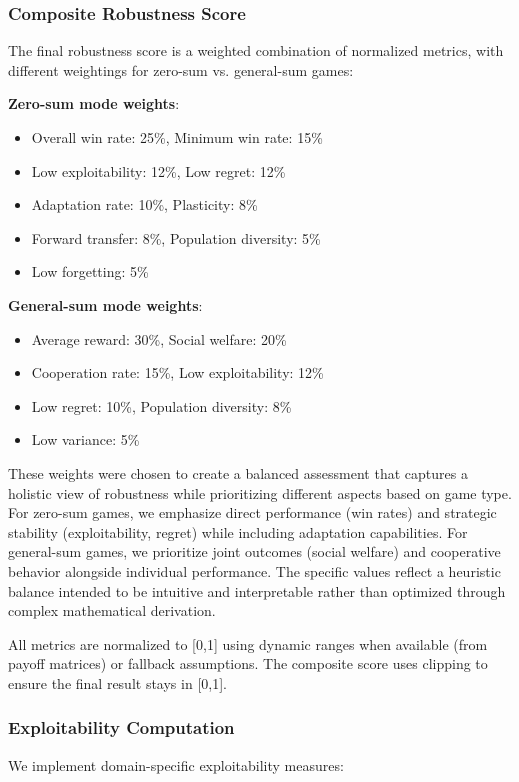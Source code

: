 \documentclass[sigconf,anonymous]{aamas}
\begin{document}
\subsubsection{Composite Robustness Score}
The final robustness score is a weighted combination of normalized metrics, with different weightings for zero-sum vs. general-sum games:

\textbf{Zero-sum mode weights}:
\begin{itemize}
\item Overall win rate: 25\%, Minimum win rate: 15\%
\item Low exploitability: 12\%, Low regret: 12\%
\item Adaptation rate: 10\%, Plasticity: 8\%
\item Forward transfer: 8\%, Population diversity: 5\%
\item Low forgetting: 5\%
\end{itemize}

\textbf{General-sum mode weights}:
\begin{itemize}
\item Average reward: 30\%, Social welfare: 20\%
\item Cooperation rate: 15\%, Low exploitability: 12\%
\item Low regret: 10\%, Population diversity: 8\%
\item Low variance: 5\%
\end{itemize}

These weights were chosen to create a balanced assessment that captures a holistic view of robustness while prioritizing different aspects based on game type. For zero-sum games, we emphasize direct performance (win rates) and strategic stability (exploitability, regret) while including adaptation capabilities. For general-sum games, we prioritize joint outcomes (social welfare) and cooperative behavior alongside individual performance. The specific values reflect a heuristic balance intended to be intuitive and interpretable rather than optimized through complex mathematical derivation.

All metrics are normalized to [0,1] using dynamic ranges when available (from payoff matrices) or fallback assumptions. The composite score uses clipping to ensure the final result stays in [0,1].

\subsubsection{Exploitability Computation}
\label{subsec:exploitability_computation}
We implement domain-specific exploitability measures:
\end{document}

